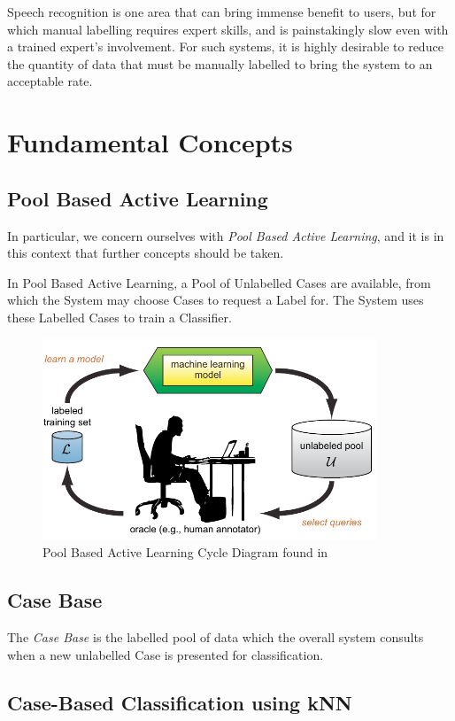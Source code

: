 \documentclass[a4paper,11pt]{report}
\begin{document}
Speech recognition is one area that can bring immense benefit to users, but for which manual labelling requires expert skills, and is painstakingly slow even with a trained expert's involvement. For such systems, it is highly desirable to reduce the quantity of data that must be manually labelled to bring the system to an acceptable rate.

\section{Fundamental Concepts}
\subsection{Pool Based Active Learning}
In particular, we concern ourselves with \emph{Pool Based Active Learning}, and it is in this context that further concepts should be taken.

In Pool Based Active Learning, a Pool of Unlabelled Cases are available, from which the System may choose Cases to request a Label for. The System uses these Labelled Cases to train a Classifier.

\begin{figure}[h!]
\includegraphics[width=10cm]{./Others/Settles2010PoolBasedImage}
\caption{Pool Based Active Learning Cycle Diagram found in \citet{Settles2010}}
\end{figure}

\subsection{Case Base}
The \emph{Case Base} is the labelled pool of data which the overall system consults when a new unlabelled Case is presented for classification.

\subsection{Case-Based Classification using kNN}
\end{document}
